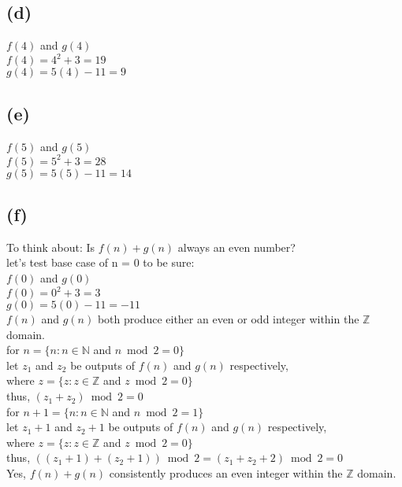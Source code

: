 \documentclass[11pt]{article}
\begin{document}
\subsection*{(d)}
\begin{center}
$f(4)$ and $g(4)$\\
$f(4) = 4^{2} + 3 = 19$\\
$g(4) = 5(4) - 11 = 9$\\
\end{center}

\subsection*{(e)}
\begin{center}
$f(5)$ and $g(5)$\\
$f(5) = 5^{2} + 3 = 28$\\
$g(5) = 5(5) - 11 = 14$\\
\end{center}

\subsection*{(f)}
\begin{center}
To think about: Is $f(n) + g(n)$ always an even number?\\
\hfill \break
let's test base case of n = 0 to be sure:\\
$f(0)$ and $g(0)$\\
$f(0) = 0^{2} + 3 = 3$\\
$g(0) = 5(0) - 11 = -11$\\
\hfill \break
$f(n)$ and $g(n)$ both produce either an even or odd integer within the $\mathbb{Z}$ domain.\\
\hfill \break
for $n = \{n: n \in \mathbb{N}$ and $n \bmod 2 = 0\}$\\
let $z_{1}$ and $z_{2}$ be outputs of $f(n)$ and $g(n)$ respectively,\\
where $z = \{z: z \in \mathbb{Z}$ and $z \bmod 2 = 0\}$\\
thus, $(z_{1} + z_{2}) \bmod 2 = 0$\\
\hfill \break
for $n+1 = \{n: n \in \mathbb{N}$ and $n \bmod 2 = 1\}$\\
let $z_{1}+1$ and $z_{2}+1$ be outputs of $f(n)$ and $g(n)$ respectively,\\
where $z = \{z: z \in \mathbb{Z}$ and $z \bmod 2 = 0\}$\\
thus, $((z_{1} + 1) + (z_{2} + 1)) \bmod 2 = (z_{1} + z_{2} + 2) \bmod 2 = 0$\\
\hfill \break
Yes, $f(n) + g(n)$ consistently produces an even integer within the $\mathbb{Z}$ domain.\\
\end{center}
%
%
\end{document}
